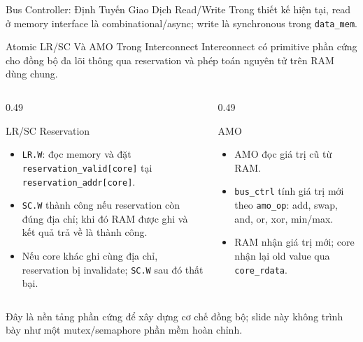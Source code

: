 \begin{frame}{Bus Controller: Định Tuyến Giao Dịch Read/Write}
    \vspace{0.05cm}
    \centering
    \scriptsize
    Trong thiết kế hiện tại, read ở memory interface là combinational/async; write là synchronous trong \texttt{data\_mem}.
\end{frame}

\begin{frame}{Atomic LR/SC Và AMO Trong Interconnect}
    \small
    Interconnect có primitive phần cứng cho đồng bộ đa lõi thông qua reservation và phép toán nguyên tử trên RAM dùng chung.

    \vspace{0.15cm}
    \begin{columns}[T]
        \begin{column}{0.49\textwidth}
            \begin{block}{LR/SC Reservation}
                \scriptsize
                \begin{itemize}
                    \item \texttt{LR.W}: đọc memory và đặt \texttt{reservation\_valid[core]} tại \texttt{reservation\_addr[core]}.
                    \item \texttt{SC.W} thành công nếu reservation còn đúng địa chỉ; khi đó RAM được ghi và kết quả trả về là thành công.
                    \item Nếu core khác ghi cùng địa chỉ, reservation bị invalidate; \texttt{SC.W} sau đó thất bại.
                \end{itemize}
            \end{block}
        \end{column}

        \begin{column}{0.49\textwidth}
            \begin{alertblock}{AMO}
                \scriptsize
                \begin{itemize}
                    \item AMO đọc giá trị cũ từ RAM.
                    \item \texttt{bus\_ctrl} tính giá trị mới theo \texttt{amo\_op}: add, swap, and, or, xor, min/max.
                    \item RAM nhận giá trị mới; core nhận lại old value qua \texttt{core\_rdata}.
                \end{itemize}
            \end{alertblock}
        \end{column}
    \end{columns}

    \vspace{0.15cm}
    \begin{center}
        \scriptsize
        Đây là nền tảng phần cứng để xây dựng cơ chế đồng bộ; slide này không trình bày như một mutex/semaphore phần mềm hoàn chỉnh.
    \end{center}
\end{frame}

